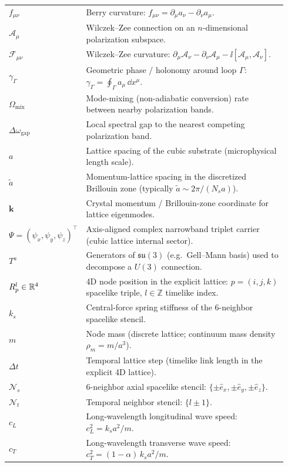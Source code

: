 \begin{center}
\begin{tabular}{p{0.22\linewidth} p{0.72\linewidth}}
$f_{\mu\nu}$ & Berry curvature: $f_{\mu\nu}=\partial_\mu a_\nu-\partial_\nu a_\mu$.\\
$\mathcal{A}_\mu$ & Wilczek--Zee connection on an $n$-dimensional polarization subspace.\\
$\mathcal{F}_{\mu\nu}$ & Wilczek--Zee curvature: $\partial_\mu\mathcal{A}_\nu-\partial_\nu\mathcal{A}_\mu-\ii[\mathcal{A}_\mu,\mathcal{A}_\nu]$.\\
$\gamma_\Gamma$ & Geometric phase / holonomy around loop $\Gamma$: $\gamma_\Gamma=\oint_\Gamma a_\mu\,\dd x^\mu$.\\
$\Omega_{\mathrm{mix}}$ & Mode-mixing (non-adiabatic conversion) rate between nearby polarization bands.\\
$\Delta\omega_{\mathrm{gap}}$ & Local spectral gap to the nearest competing polarization band.\\
$a$ & Lattice spacing of the cubic substrate (microphysical length scale).\\
$\tilde a$ & Momentum-lattice spacing in the discretized Brillouin zone (typically $\tilde a\sim 2\pi/(N_sa)$).\\
$\mathbf{k}$ & Crystal momentum / Brillouin-zone coordinate for lattice eigenmodes.\\
$\Psi=(\psi_x,\psi_y,\psi_z)^\top$ & Axis-aligned complex narrowband triplet carrier (cubic lattice internal sector).\\
$T^a$ & Generators of $\mathfrak{su}(3)$ (e.g.\ Gell--Mann basis) used to decompose a $U(3)$ connection.\\
$R_p^l\in\mathbb{R}^4$ & 4D node position in the explicit lattice: $p=(i,j,k)$ spacelike triple, $l\in\mathbb{Z}$ timelike index.\\
$k_s$ & Central-force spring stiffness of the 6-neighbor spacelike stencil.\\
$m$ & Node mass (discrete lattice; continuum mass density $\rho_m=m/a^3$).\\
$\Delta t$ & Temporal lattice step (timelike link length in the explicit 4D lattice).\\
$\mathcal{N}_s$ & 6-neighbor axial spacelike stencil: $\{\pm\hat{e}_x,\pm\hat{e}_y,\pm\hat{e}_z\}$.\\
$\mathcal{N}_t$ & Temporal neighbor stencil: $\{l\pm 1\}$.\\
$c_L$ & Long-wavelength longitudinal wave speed: $c_L^2=k_s a^2/m$.\\
$c_T$ & Long-wavelength transverse wave speed: $c_T^2=(1-\alpha)\,k_s a^2/m$.\\
\end{tabular}
\end{center}
